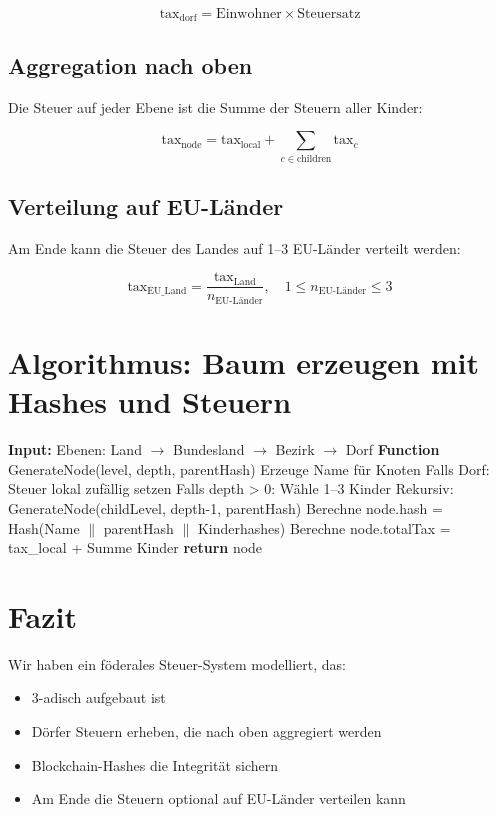 \documentclass[a4paper,12pt]{article}
\begin{document}
\begin{equation}
\text{tax}_\text{dorf} = \text{Einwohner} \times \text{Steuersatz}
\end{equation}

\subsection{Aggregation nach oben}
Die Steuer auf jeder Ebene ist die Summe der Steuern aller Kinder:

\begin{equation}
\text{tax}_\text{node} = \text{tax}_\text{local} + \sum_{c \in \text{children}} \text{tax}_c
\end{equation}

\subsection{Verteilung auf EU-Länder}
Am Ende kann die Steuer des Landes auf 1--3 EU-Länder verteilt werden:

\begin{equation}
\text{tax}_\text{EU\_Land} = \frac{\text{tax}_\text{Land}}{n_\text{EU-Länder}}, \quad 1 \le n_\text{EU-Länder} \le 3
\end{equation}

\section{Algorithmus: Baum erzeugen mit Hashes und Steuern}
\begin{algorithm}
\caption{Erzeuge 3-adischen Steuerbaum mit Blockchain-Hash}
\begin{algorithmic}[1]
\STATE \textbf{Input:} Ebenen: Land $\rightarrow$ Bundesland $\rightarrow$ Bezirk $\rightarrow$ Dorf
\STATE \textbf{Function} GenerateNode(level, depth, parentHash)
\STATE \quad Erzeuge Name für Knoten
\STATE \quad Falls Dorf: Steuer lokal zufällig setzen
\STATE \quad Falls depth > 0:
\STATE \quad \quad Wähle 1--3 Kinder
\STATE \quad \quad Rekursiv: GenerateNode(childLevel, depth-1, parentHash)
\STATE \quad Berechne node.hash = Hash(Name $\|$ parentHash $\|$ Kinderhashes)
\STATE \quad Berechne node.totalTax = tax\_local + Summe Kinder
\STATE \quad \textbf{return} node
\end{algorithmic}
\end{algorithm}

\section{Fazit}
Wir haben ein föderales Steuer-System modelliert, das:
\begin{itemize}
    \item 3-adisch aufgebaut ist
    \item Dörfer Steuern erheben, die nach oben aggregiert werden
    \item Blockchain-Hashes die Integrität sichern
    \item Am Ende die Steuern optional auf EU-Länder verteilen kann
\end{itemize}
\end{document}

